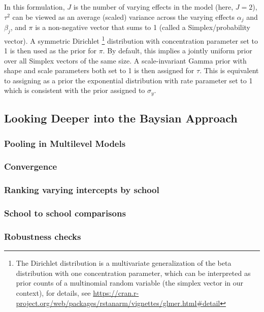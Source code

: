 In this formulation, $J$ is the number of varying effects in the model (here, $J=2$), $\tau^2$ can be viewed as an average (scaled) variance across the varying effects $\alpha_j$ and $\beta_j$, and $\pi$ is a non-negative vector that sums to 1 (called a Simplex/probability vector).  A symmetric Dirichlet \footnote{The Dirichlet distribution is a multivariate generalization of the beta distribution with one concentration parameter, which can be interpreted as prior counts of a multinomial random variable (the simplex vector in our context), for details, see \url{https://cran.r-project.org/web/packages/rstanarm/vignettes/glmer.html\#detail}} distribution with concentration parameter set to 1 is then used as the prior for $\pi$.  By default, this implies a jointly uniform prior over all Simplex vectors of the same size.  A scale-invariant Gamma prior with shape and scale parameters both set to 1 is then assigned for $\tau$.  This is equivalent to assigning as a prior the exponential distribution with rate parameter set to 1 which is consistent with the prior assigned to $\sigma_y$. 



\subsection{Looking Deeper into the Baysian Approach}
\label{section:Deeper}


\subsubsection{Pooling in Multilevel Models}
\subsubsection{Convergence}
\subsubsection{Ranking varying intercepts by school}
\subsubsection{School to school comparisons}
\subsubsection{Robustness checks}






